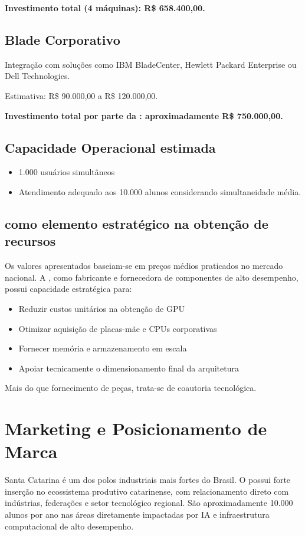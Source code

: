 \documentclass[12pt,a4paper,]{abntex2}
\begin{document}
\textbf{Investimento total (4 máquinas): R\$ 658.400,00.}

\section{Blade Corporativo}

Integração com soluções como IBM BladeCenter, Hewlett Packard Enterprise ou Dell Technologies.

Estimativa: R\$ 90.000,00 a R\$ 120.000,00.

\textbf{Investimento total por parte da \empresaParceiraAbr: aproximadamente R\$ 750.000,00.}

\section{Capacidade Operacional estimada}

\begin{itemize}
\item 1.000 usuários simultâneos
\item Atendimento adequado aos 10.000 alunos considerando simultaneidade média.
\end{itemize}

\section{\empresaParceiraAbr como elemento estratégico na obtenção de recursos}
Os valores apresentados baseiam-se em preços médios praticados no mercado nacional.
A \empresaParceiraAbr, como fabricante e fornecedora de componentes de alto desempenho, possui capacidade estratégica para:
\begin{itemize}
\item Reduzir custos unitários na obtenção de GPU
\item Otimizar aquisição de placas-mãe e CPUs corporativas
\item Fornecer memória e armazenamento em escala
\item Apoiar tecnicamente o dimensionamento final da arquitetura
\end{itemize}

Mais do que fornecimento de peças, trata-se de coautoria tecnológica.

\chapter{Marketing e Posicionamento de Marca}
Santa Catarina é um dos polos industriais mais fortes do Brasil. O \empresaExecutoraAbr possui forte inserção no ecossistema produtivo catarinense, com relacionamento direto com indústrias, federações e setor tecnológico regional.
São aproximadamente 10.000 alunos por ano nas áreas diretamente impactadas por IA e infraestrutura computacional de alto desempenho.
\end{document}
